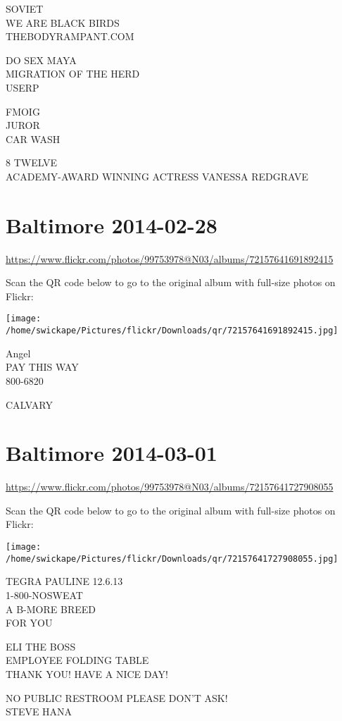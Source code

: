 \documentclass[10pt,letterpaper]{article}
\begin{document}
SOVIET\\
WE ARE BLACK BIRDS\\
THEBODYRAMPANT.COM

DO SEX MAYA\\
MIGRATION OF THE HERD\\
USERP

FMOIG\\
JUROR\\
CAR WASH

8 TWELVE\\
ACADEMY{-}AWARD WINNING ACTRESS VANESSA REDGRAVE
\pagebreak

\section*{Baltimore 2014-02-28}

\url{https://www.flickr.com/photos/99753978@N03/albums/72157641691892415}

Scan the QR code below to go to the original album with full-size photos on Flickr:

\texttt{[image: /home/swickape/Pictures/flickr/Downloads/qr/72157641691892415.jpg]}
\pagebreak

Angel\\
PAY THIS WAY\\
800{-}6820

CALVARY
\pagebreak

\section*{Baltimore 2014-03-01}

\url{https://www.flickr.com/photos/99753978@N03/albums/72157641727908055}

Scan the QR code below to go to the original album with full-size photos on Flickr:

\texttt{[image: /home/swickape/Pictures/flickr/Downloads/qr/72157641727908055.jpg]}
\pagebreak

TEGRA PAULINE 12.6.13\\
1{-}800{-}NOSWEAT\\
A B{-}MORE BREED\\
FOR YOU

ELI THE BOSS\\
EMPLOYEE FOLDING TABLE\\
THANK YOU!  HAVE A NICE DAY!

NO PUBLIC RESTROOM PLEASE DON'T ASK!\\
STEVE HANA
\end{document}
